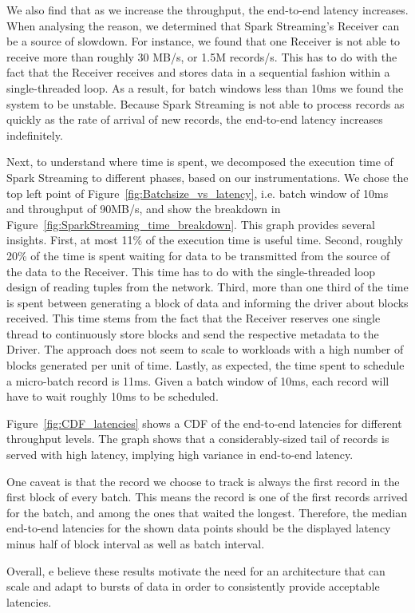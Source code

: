We also find that as we increase the throughput, the end-to-end latency increases.
When analysing the reason, we determined that Spark Streaming's Receiver can be a source of slowdown.
For instance, we found that one Receiver is not able to receive more than roughly 30 MB/s, or 1.5M records/s.
This has to do with the fact that the Receiver receives and stores data in a sequential fashion within a single-threaded loop.
As a result, for batch windows less than 10ms we found the system to be unstable. 
Because Spark Streaming is not able to process records as quickly as the rate of arrival of new records, the end-to-end latency increases indefinitely.

Next, to understand where time is spent, we decomposed the execution time of Spark Streaming to different phases, based on our instrumentations.
We chose the top left point of Figure~\ref{fig:Batchsize_vs_latency}, i.e. batch window of 10ms and throughput of 90MB/s, and show the breakdown in Figure~\ref{fig:SparkStreaming_time_breakdown}. 
This graph provides several insights. 
First, at most 11\% of the execution time is useful time.
Second, roughly 20\% of the time is spent waiting for data to be transmitted from the source of the data to the Receiver.
This time has to do with the single-threaded loop design of reading tuples from the network.
Third, more than one third of the time is spent between generating a block of data and informing the driver about blocks received.
This time stems from the fact that the Receiver reserves one single thread to continuously store blocks and send the respective metadata to the Driver.
The approach does not seem to scale to workloads with a high number of blocks generated per unit of time.
Lastly, as expected, the time spent to schedule a micro-batch record is 11ms. Given a batch window of 10ms, each record will have to wait roughly 10ms to be scheduled.

Figure~\ref{fig:CDF_latencies} shows a CDF of the end-to-end latencies for different throughput levels. The graph shows that a considerably-sized tail of records is served with high latency, implying high variance in end-to-end latency.

One caveat is that the record we choose to track is always the first record in the first block of every batch. This means the record is one of the first records arrived for the batch, and among the ones that waited the longest. Therefore, the median end-to-end latencies for the shown data points should be the displayed latency minus half of block interval as well as batch interval.

Overall, e believe these results motivate the need for an architecture that can scale and adapt to bursts of data in order to consistently provide acceptable latencies.

